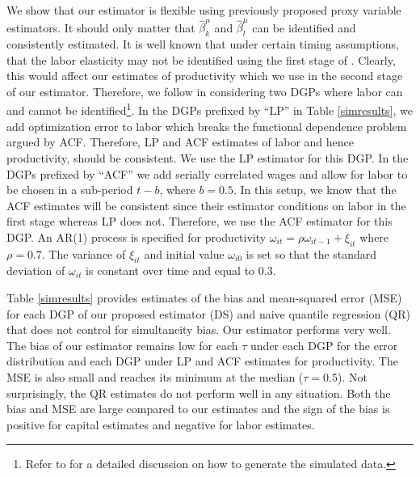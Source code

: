 \documentclass[11pt]{article}
\begin{document}
We show that our estimator is flexible using previously proposed proxy variable estimators. It should only matter that $\hat{\beta}_{k}^{\mu}$ and $\hat{\beta}_{l}^{\mu}$ can be identified and consistently estimated. It is well known that under certain timing assumptions, that the labor elasticity may not be identified using the first stage of \cite{Levinsohn2003}. Clearly, this would affect our estimates of productivity which we use in the second stage of our estimator. Therefore, we follow \cite{Ackerberg2015} in considering two DGPs where labor can and cannot be identified\footnote{Refer to \cite{Ackerberg2015} for a detailed discussion on how to generate the simulated data.}. In the DGPs prefixed by ``LP'' in Table \ref{simresults}, we add optimization error to labor which breaks the functional dependence problem argued by ACF. Therefore, LP and ACF estimates of labor and hence productivity, should be consistent. We use the LP estimator for this DGP. In the DGPs prefixed by ``ACF'' we add serially correlated wages and allow for labor to be chosen in a sub-period $t-b$, where $b=0.5$. In this setup, we know that the ACF estimates will be consistent since their estimator conditions on labor in the first stage whereas LP does not. Therefore, we use the ACF estimator for this DGP. An AR(1) process is specified for productivity $\omega_{it}=\rho\omega_{it-1}+\xi_{it}$ where $\rho=0.7$. The variance of $\xi_{it}$ and initial value $\omega_{i0}$ is set so that the standard deviation of $\omega_{it}$ is constant over time and equal to $0.3$. 

Table \ref{simresults} provides estimates of the bias and mean-squared error (MSE) for each DGP of our proposed estimator (DS) and naive quantile regression (QR) that does not control for simultaneity bias. Our estimator performs very well. The bias of our estimator remains low for each $\tau$ under each DGP for the error distribution and each DGP under LP and ACF estimates for productivity. The MSE is also small and reaches its minimum at the median ($\tau=0.5$). Not surprisingly, the QR estimates do not perform well in any situation. Both the bias and MSE are large compared to our estimates and the sign of the bias is positive for capital estimates and negative for labor estimates.

\pagebreak
\newpage
\end{document}
